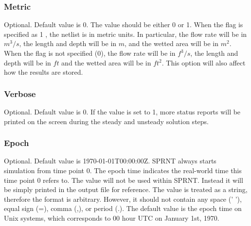 \documentclass[10pt, letterpaper]{article}
\begin{document}
\subsubsection{Metric}
\label{subsubsec:metric}
Optional. Default value is 0. The value should be either 0 or 1. When the flag is
specified as 1 , the netlist is in metric units. In particular, the flow rate will be in
$m^3/s$, the length and depth will be in $m$, and the wetted area will be in $m^2$. When
the flag is not specified (0), the flow rate will be in $f^3/s$, the length and depth will
be in $ft$ and the wetted area will be in $ft^2$.  This option will also affect how the
results are stored.

\subsubsection{Verbose}
\label{subsubsec:verbose}
Optional. Default value is 0. If the value is set to 1, more status reports will be
printed on the screen during the steady and unsteady solution steps.

\subsubsection{Epoch}
\label{subsubsec:epoch}
Optional. Default value is 1970-01-01T00:00:00Z. SPRNT always starts simulation from time
point 0. The epoch time indicates the real-world time this time point 0 refers to. The
value will not be used within SPRNT. Instead it will be simply printed in the output file
for reference. The value is treated as a string, therefore the format is
arbitrary. However, it should not contain any space (' '), equal sign (=), comma (,), or
period (.). The default value is the epoch time on Unix systems, which corresponds to 00
hour UTC on January 1st, 1970. 
\end{document}
